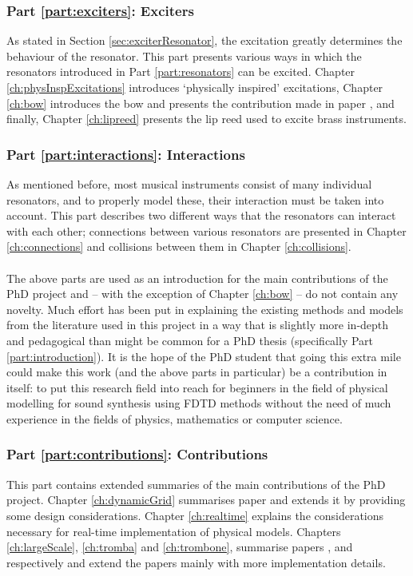\subsubsection{Part \ref{part:exciters}: Exciters} 
As stated in Section \ref{sec:exciterResonator}, the excitation greatly determines the behaviour of the resonator. This part
presents various ways in which the resonators introduced in Part \ref{part:resonators} can be excited. Chapter \ref{ch:physInspExcitations} introduces `physically inspired' excitations, Chapter \ref{ch:bow} introduces the bow and presents the contribution made in paper \citeP[C], and finally, Chapter \ref{ch:lipreed} presents the lip reed used to excite brass instruments.

\subsubsection{Part \ref{part:interactions}: Interactions}
As mentioned before, most musical instruments consist of many individual resonators, and to properly model these, their interaction must be taken into account. This part describes two different ways that the resonators can interact with each other; connections between various resonators are presented in Chapter \ref{ch:connections} and collisions between them in Chapter \ref{ch:collisions}. 
\\
\\

\noindent The above parts are used as an introduction for the main contributions of the PhD project and -- with the exception of Chapter \ref{ch:bow} -- do not contain any novelty. Much effort has been put in explaining the existing methods and models from the literature used in this project in a way that is slightly more in-depth and pedagogical than might be common for a PhD thesis (specifically Part \ref{part:introduction}). It is the hope of the PhD student that going this extra mile could make this work (and the above parts in particular) be a contribution in itself: to put this research field into reach for beginners in the field of physical modelling for sound synthesis using FDTD methods without the need of much experience in the fields of physics, mathematics or computer science. 
\\

\subsubsection{Part \ref{part:contributions}: Contributions} This part contains extended summaries of the main contributions of the PhD project. Chapter \ref{ch:dynamicGrid} summarises paper \citeP[G] and extends it by providing some design considerations. Chapter \ref{ch:realtime} explains the considerations necessary for real-time implementation of physical models. Chapters \ref{ch:largeScale}, \ref{ch:tromba} and \ref{ch:trombone}, summarise papers \citeP[A], \citeP[D] and \citeP[H] respectively and extend the papers mainly with more implementation details.


